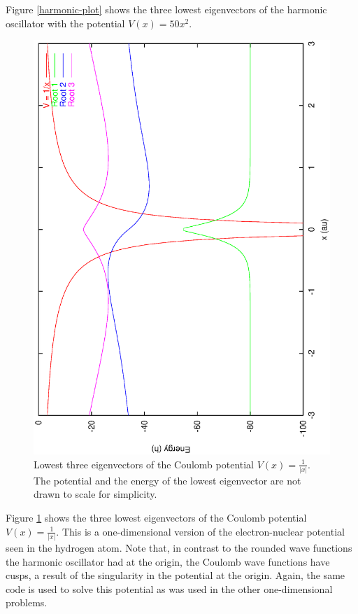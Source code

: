 Figure \ref{harmonic-plot} shows the three lowest eigenvectors of the
harmonic oscillator with the potential $V(x)=50x^2$.


\begin{figure}
\begin{center}
\includegraphics[scale=0.5,angle=270]{coulomb.eps}
\end{center}
\caption{Lowest three eigenvectors of the Coulomb potential
$V(x)=\frac{1}{|x|}$. The potential and the energy of the lowest
eigenvector are not drawn to scale for simplicity.}
\label{coulomb-plot}
\end{figure}

Figure \ref{coulomb-plot} shows the three lowest eigenvectors of the
Coulomb potential $V(x)=\frac{1}{|x|}$. This is a one-dimensional
version of the electron-nuclear potential seen in the hydrogen
atom. Note that, in contrast to the rounded wave functions the
harmonic oscillator had at the origin, the Coulomb wave functions have
cusps, a result of the singularity in the potential at the
origin. Again, the same code is used to solve this potential as was
used in the other one-dimensional problems.

